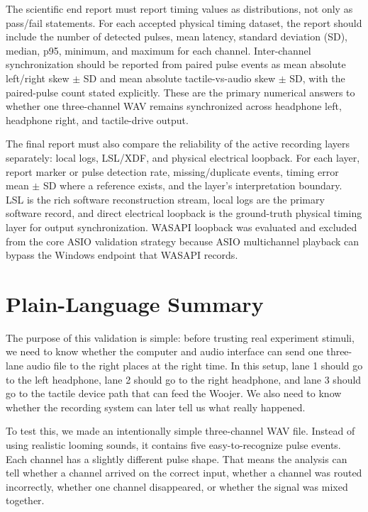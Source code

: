 \documentclass[11pt]{article}
\begin{document}
The scientific end report must report timing values as distributions, not only
as pass/fail statements. For each accepted physical timing dataset, the report
should include the number of detected pulses, mean latency, standard deviation
(SD), median, p95, minimum, and maximum for each channel. Inter-channel
synchronization should be reported from paired pulse events as mean absolute
left/right skew $\pm$ SD and mean absolute tactile-vs-audio skew $\pm$ SD,
with the paired-pulse count stated explicitly. These are the primary numerical
answers to whether one three-channel WAV remains synchronized across headphone
left, headphone right, and tactile-drive output.

The final report must also compare the reliability of the active recording
layers separately: local logs, LSL/XDF, and physical electrical loopback. For
each layer, report marker or pulse detection rate, missing/duplicate events,
timing error mean $\pm$ SD where a reference exists, and the layer's
interpretation boundary. LSL is the rich software reconstruction stream, local
logs are the primary software record, and direct electrical loopback is the
ground-truth physical timing layer for output synchronization. WASAPI loopback
was evaluated and excluded from the core ASIO validation strategy because ASIO
multichannel playback can bypass the Windows endpoint that WASAPI records.

\section{Plain-Language Summary}

The purpose of this validation is simple: before trusting real experiment
stimuli, we need to know whether the computer and audio interface can send one
three-lane audio file to the right places at the right time. In this setup,
lane 1 should go to the left headphone, lane 2 should go to the right
headphone, and lane 3 should go to the tactile device path that can feed the
Woojer. We also need to know whether the recording system can later tell us
what really happened.

To test this, we made an intentionally simple three-channel WAV file. Instead
of using realistic looming sounds, it contains five easy-to-recognize pulse
events. Each channel has a slightly different pulse shape. That means the
analysis can tell whether a channel arrived on the correct input, whether a
channel was routed incorrectly, whether one channel disappeared, or whether the
signal was mixed together.
\end{document}
